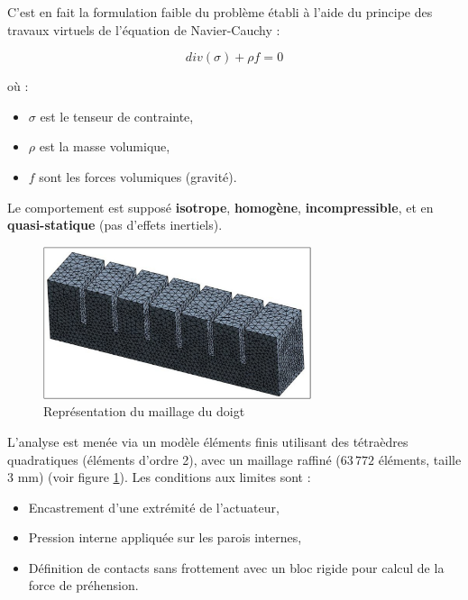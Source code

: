 \documentclass[a4paper, 11pt]{report}
\begin{document}
            C'est en fait la formulation faible du problème établi à l'aide du principe des travaux virtuels de l'équation de Navier-Cauchy :

            \[
            div(\sigma) + \rho f = 0
            \]

            où :
            \begin{itemize}
            \item \( \sigma \) est le tenseur de contrainte,
            \item \( \rho \) est la masse volumique,
            \item \( f \) sont les forces volumiques (gravité).
            \end{itemize}

            Le comportement est supposé \textbf{isotrope}, \textbf{homogène}, \textbf{incompressible}, et en \textbf{quasi-statique} (pas d’effets inertiels).

            \begin{figure}
                \centering
                \includegraphics[width=0.7\textwidth]{Figures/doigt_finit_elements.jpg}
                \caption{Représentation du maillage du doigt \cite{bhat_numerical_2025}}
                \label{fig:doigt_finit_elements}
            \end{figure}

            L’analyse est menée via un modèle éléments finis utilisant des tétraèdres quadratiques (éléments d'ordre 2), avec un maillage raffiné (\( 63\,772 \) éléments, taille 3 mm) (voir figure \ref{fig:doigt_finit_elements}). Les conditions aux limites sont :
            \begin{itemize}
            \item Encastrement d’une extrémité de l’actuateur,
            \item Pression interne appliquée sur les parois internes,
            \item Définition de contacts sans frottement avec un bloc rigide pour calcul de la force de préhension.
            \end{itemize}
\end{document}
